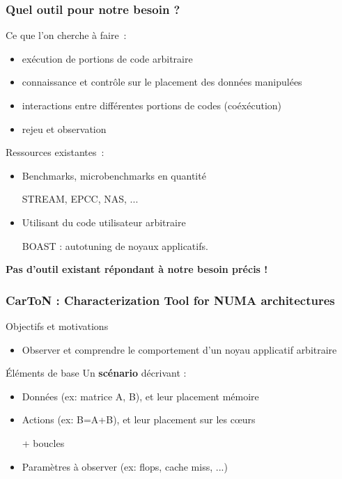 \documentclass[xcolor={usenames,dvipsnames,svgnames,table}, aspectratio=43]{beamer}
\begin{document}
\begin{frame}
  \frametitle{Quel outil pour notre besoin ?}

  Ce que l'on cherche à faire~:
  \begin{itemize}
    \item exécution de portions de code arbitraire
    \item connaissance et contrôle sur le placement des données manipulées
    \item interactions entre différentes portions de codes (coéxécution)
    \item rejeu et observation
  \end{itemize}

  Ressources existantes~:
  \begin{itemize}
    \item Benchmarks, microbenchmarks en quantité

      STREAM, EPCC, NAS, ...

    \item Utilisant du code utilisateur arbitraire

      BOAST : autotuning de noyaux applicatifs.
  \end{itemize}

  \textbf{Pas d'outil existant répondant à notre besoin précis !}

\end{frame}

\begin{frame}
  \frametitle{CarToN : Characterization Tool for NUMA architectures}

  \begin{block}{Objectifs et motivations}
    \begin{itemize}
      \item Observer et comprendre le comportement d'un noyau applicatif arbitraire
    \end{itemize}
  \end{block}

  \begin{block}{Éléments de base}
    Un \textbf{scénario} décrivant :
    \begin{itemize}
      \item Données (ex: matrice A, B), et leur placement mémoire
      \item Actions (ex: B=A+B), et leur placement sur les cœurs

	+ boucles
      \item Paramètres à observer (ex: flops, cache miss, ...)
    \end{itemize}
  \end{block}
\end{frame}
\end{document}
